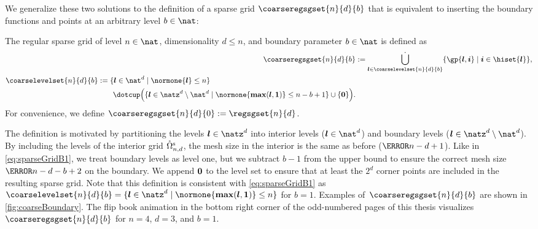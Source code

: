 We generalize these two solutions to the definition of a
sparse grid $\coarseregsgset{n}{d}{b}$ that is equivalent to inserting
the boundary functions and points at an arbitrary level $b \in \nat$:
\begin{definition}
  \label{def:coarseBoundary}
  The regular sparse grid of level $n \in \nat$,
  dimensionality $d \le n$, and boundary parameter $b \in \nat$ is defined as
  \begin{subequations}
    \begin{align}
      \label{eq:coarseBoundary1}
      \coarseregsgset{n}{d}{b}
      &:= \bigdotcup_{\*l \in \coarselevelset{n}{d}{b}}
      \{\gp{\*l,\*i} \mid \*i \in \hiset{\*l}\},\\
      \label{eq:coarseBoundary2}
      \begin{split}
        \coarselevelset{n}{d}{b}
        &:= \{\*l \in \nat^d \mid \normone{\*l} \le n\}\\
        &\qquad {} \dotcup \paren*{
          \{\*l \in \natz^d \setminus \nat^d \mid
          \normone{\vecmax(\*l, \*1)} \le n-b+1\} \cup \{\*0\}
        }.
      \end{split}
    \end{align}
  \end{subequations}
  For convenience, we define
  $\coarseregsgset{n}{d}{0} := \regsgset{n}{d}$.
\end{definition}
The definition is motivated by partitioning the levels $\*l \in \natz^d$
into interior levels ($\*l \in \nat^d$)
and boundary levels ($\*l \in \natz^d \setminus \nat^d$).
By including the levels of the interior grid $\interiorregsgset{n}{d}$,
the mesh size in the interior is the same as before ($\ms{n-d+1}$).
Like in \eqref{eq:sparseGridB1}, we treat boundary levels as level one,
but we subtract $b - 1$ from the upper bound to ensure the correct
mesh size $\ms{n-d-b+2}$ on the boundary.
We append ${\boldsymbol{0}}$ to the level set to ensure that at least the $2^d$ corner
points are included in the resulting sparse grid.
Note that this definition is consistent with \eqref{eq:sparseGridB1} as
$\coarselevelset{n}{d}{b}
= \{\*l \in \natz^d \mid \normone{\vecmax(\*l, \*1)} \le n\}$
for $b = 1$.
Examples of~$\coarseregsgset{n}{d}{b}$ are shown
in \cref{fig:coarseBoundary}.
The flip book animation in the bottom right corner of the
odd-numbered pages of this thesis
visualizes $\coarseregsgset{n}{d}{b}$ for $n = 4$, $d = 3$, and $b = 1$.

